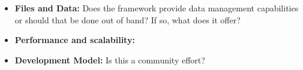 \documentclass{sig-alternate}
\begin{document}
\begin{itemize}
\item \textbf{Files and Data:} Does the framework provide data
  management capabilities or should that be done out of band? If so, what does
  it offer?

\item \textbf{Performance and scalability:} 

\item \textbf{Development Model:} Is this a community effort?

\end{itemize}
\end{document}
